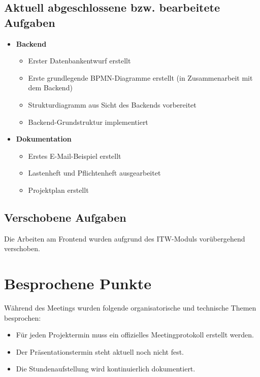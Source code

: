 \documentclass[a4paper,11pt]{article}
\begin{document}
\subsection{Aktuell abgeschlossene bzw. bearbeitete Aufgaben}

\begin{itemize}[leftmargin=1.2cm]

    \item \textbf{Backend}
    \begin{itemize}
        \item Erster Datenbankentwurf erstellt
        \item Erste grundlegende BPMN-Diagramme erstellt (in Zusammenarbeit mit dem Backend)
        \item Strukturdiagramm aus Sicht des Backends vorbereitet
        \item Backend-Grundstruktur implementiert
    \end{itemize}

    \item \textbf{Dokumentation}
    \begin{itemize}
        \item Erstes E-Mail-Beispiel erstellt
        \item Lastenheft und Pflichtenheft ausgearbeitet
        \item Projektplan erstellt
    \end{itemize}

\end{itemize}

\vspace{0.5cm}

\subsection{Verschobene Aufgaben}

Die Arbeiten am Frontend wurden aufgrund des ITW-Moduls vorübergehend verschoben.

\vspace{0.5cm}

\section{Besprochene Punkte}

Während des Meetings wurden folgende organisatorische und technische Themen besprochen:

\begin{itemize}[leftmargin=1.2cm]
    \item Für jeden Projektermin muss ein offizielles Meetingprotokoll erstellt werden.
    \item Der Präsentationstermin steht aktuell noch nicht fest.
    \item Die Stundenaufstellung wird kontinuierlich dokumentiert.
\end{itemize}
\end{document}
